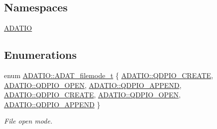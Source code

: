 \subsection*{Namespaces}
\begin{DoxyCompactItemize}
\item 
 \mbox{\hyperlink{namespaceADATIO}{A\+D\+A\+T\+IO}}
\end{DoxyCompactItemize}
\subsection*{Enumerations}
\begin{DoxyCompactItemize}
\item 
enum \mbox{\hyperlink{group__qio_ga669520ca9003997be838730beef322b4}{A\+D\+A\+T\+I\+O\+::\+A\+D\+A\+T\+\_\+filemode\+\_\+t}} \{ \newline
\mbox{\hyperlink{group__qio_gga669520ca9003997be838730beef322b4a977eb79b8f4ae7cfd75c9dbcc992b84f}{A\+D\+A\+T\+I\+O\+::\+Q\+D\+P\+I\+O\+\_\+\+C\+R\+E\+A\+TE}}, 
\mbox{\hyperlink{group__qio_gga669520ca9003997be838730beef322b4a6dd4c4da4f92babb9ab4c28f4aa13231}{A\+D\+A\+T\+I\+O\+::\+Q\+D\+P\+I\+O\+\_\+\+O\+P\+EN}}, 
\mbox{\hyperlink{group__qio_gga669520ca9003997be838730beef322b4aae9e16570c37ba9ace5529d3bc48b9a8}{A\+D\+A\+T\+I\+O\+::\+Q\+D\+P\+I\+O\+\_\+\+A\+P\+P\+E\+ND}}, 
\mbox{\hyperlink{group__qio_gga669520ca9003997be838730beef322b4a977eb79b8f4ae7cfd75c9dbcc992b84f}{A\+D\+A\+T\+I\+O\+::\+Q\+D\+P\+I\+O\+\_\+\+C\+R\+E\+A\+TE}}, 
\newline
\mbox{\hyperlink{group__qio_gga669520ca9003997be838730beef322b4a6dd4c4da4f92babb9ab4c28f4aa13231}{A\+D\+A\+T\+I\+O\+::\+Q\+D\+P\+I\+O\+\_\+\+O\+P\+EN}}, 
\mbox{\hyperlink{group__qio_gga669520ca9003997be838730beef322b4aae9e16570c37ba9ace5529d3bc48b9a8}{A\+D\+A\+T\+I\+O\+::\+Q\+D\+P\+I\+O\+\_\+\+A\+P\+P\+E\+ND}}
 \}
\begin{DoxyCompactList}\small\item\em File open mode. \end{DoxyCompactList}\end{DoxyCompactItemize}
